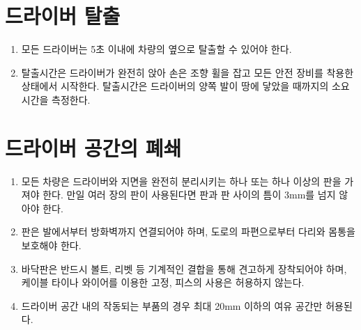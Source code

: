 \documentclass[final,a4paper,10pt]{report}
\begin{document}
\section{드라이버 탈출}\label{rule:formula-technical.driver-egress} \label{section:드라이버 탈출}
\begin{enumerate}
  \item\label{rule:formula-technical.driver-egress.exit-within-5s} 모든 드라이버는 5초 이내에 차량의 옆으로 탈출할 수 있어야 한다.
  \item\label{rule:formula-technical.driver-egress.egress-time-measurement} 탈출시간은 드라이버가 완전히 앉아 손은 조향 휠을 잡고 모든 안전 장비를 착용한 상태에서 시작한다. 탈출시간은 드라이버의 양쪽 발이 땅에 닿았을 때까지의 소요시간을 측정한다.
\end{enumerate}

\section{드라이버 공간의 폐쇄}\label{rule:formula-technical.cockpit-closure} \label{section:드라이버 공간 폐쇄}
\begin{enumerate}
  \item\label{rule:formula-technical.cockpit-closure.floor-panel-gap-3mm} 모든 차량은 드라이버와 지면을 완전히 분리시키는 하나 또는 하나 이상의 판을 가져야 한다. 만일 여러 장의 판이 사용된다면 판과 판 사이의 틈이 3mm를 넘지 않아야 한다.
  \item\label{rule:formula-technical.cockpit-closure.panel-feet-to-firewall} 판은 발에서부터 방화벽까지 연결되어야 하며, 도로의 파편으로부터 다리와 몸통을 보호해야 한다.
  \item\label{rule:formula-technical.cockpit-closure.floor-panel-fastening-method} 바닥판은 반드시 볼트, 리벳 등 기계적인 결합을 통해 견고하게 장착되어야 하며, 케이블 타이나 와이어를 이용한 고정, 피스의 사용은 허용하지 않는다.
  \item\label{rule:formula-technical.cockpit-closure.moving-part-clearance-20mm} 드라이버 공간 내의 작동되는 부품의 경우 최대 20mm 이하의 여유 공간만 허용된다.
\end{enumerate}
\end{document}
